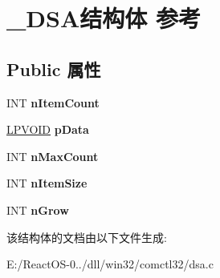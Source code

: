\hypertarget{struct___d_s_a}{}\section{\+\_\+\+D\+S\+A结构体 参考}
\label{struct___d_s_a}
\subsection*{Public 属性}
\begin{DoxyCompactItemize}
\item 
\mbox{\label{struct___d_s_a_aa2465ee3f001d93be9749602783efd16}} 
I\+NT {\bfseries n\+Item\+Count}
\item 
\mbox{\label{struct___d_s_a_a62a73a7f0ca20db9ef2721c36ff7b569}} 
\hyperlink{interfacevoid}{L\+P\+V\+O\+ID} {\bfseries p\+Data}
\item 
\mbox{\label{struct___d_s_a_ac7187aa4498e1e19d2d0b6cbfaa6778a}} 
I\+NT {\bfseries n\+Max\+Count}
\item 
\mbox{\label{struct___d_s_a_a9e4cac0d5e6f343d48731cb93b91abad}} 
I\+NT {\bfseries n\+Item\+Size}
\item 
\mbox{\label{struct___d_s_a_aa2302b15c0985c77a5eb2ee145f1a845}} 
I\+NT {\bfseries n\+Grow}
\end{DoxyCompactItemize}


该结构体的文档由以下文件生成\+:\begin{DoxyCompactItemize}
\item 
E\+:/\+React\+O\+S-\/0../dll/win32/comctl32/dsa.\+c\end{DoxyCompactItemize}
